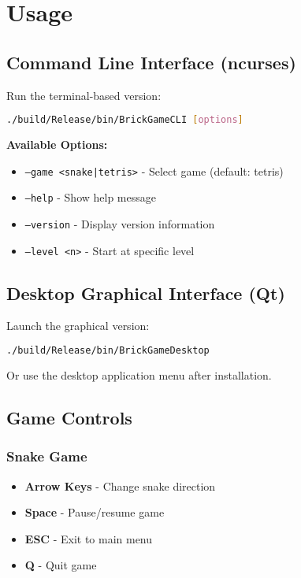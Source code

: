 \documentclass[12pt]{article}
\begin{document}
\section{Usage}

\subsection{Command Line Interface (ncurses)}
Run the terminal-based version:
\begin{lstlisting}[language=bash]
./build/Release/bin/BrickGameCLI [options]
\end{lstlisting}

\textbf{Available Options:}
\begin{itemize}
    \item \texttt{--game <snake|tetris>} - Select game (default: tetris)
    \item \texttt{--help} - Show help message
    \item \texttt{--version} - Display version information
    \item \texttt{--level <n>} - Start at specific level
\end{itemize}

\subsection{Desktop Graphical Interface (Qt)}
Launch the graphical version:
\begin{lstlisting}[language=bash]
./build/Release/bin/BrickGameDesktop
\end{lstlisting}

Or use the desktop application menu after installation.

\subsection{Game Controls}

\subsubsection{Snake Game}
\begin{itemize}
    \item \textbf{Arrow Keys} - Change snake direction
    \item \textbf{Space} - Pause/resume game
    \item \textbf{ESC} - Exit to main menu
    \item \textbf{Q} - Quit game
\end{itemize}
\end{document}
